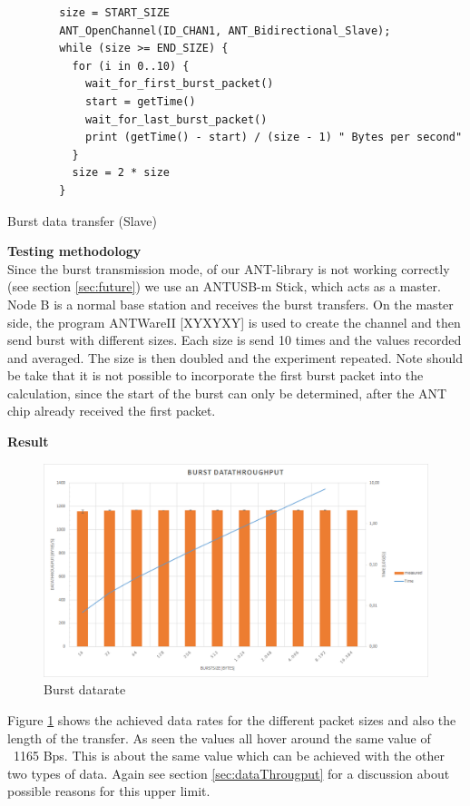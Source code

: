 \begin{description}
	\begin{code}[H]
		\begin{verbatim}
		size = START_SIZE
		ANT_OpenChannel(ID_CHAN1, ANT_Bidirectional_Slave);		
		while (size >= END_SIZE) {
		  for (i in 0..10) {
		    wait_for_first_burst_packet()
		    start = getTime()
		    wait_for_last_burst_packet()
		    print (getTime() - start) / (size - 1) " Bytes per second"
		  }
		  size = 2 * size
		}
		\end{verbatim}
		\caption{Burst data transfer (Slave)}\label{lst:sExp5}
	\end{code}
	\item{\textbf{Testing methodology}} \hfill \\ Since the burst transmission mode, of our ANT-library is not working correctly (see section \ref{sec:future}) we use an ANTUSB-m Stick, which acts as a master. Node B is a normal base station and receives the burst transfers. On the master side, the program ANTWareII [XYXYXY] is used to create the channel and then send burst with different sizes. Each size is send 10 times and the values recorded and averaged. The size is then doubled and the experiment repeated. Note should be take that it is not possible to incorporate the first burst packet into the calculation, since the start of the burst can only be determined, after the ANT chip already received the first packet.
	\item{\textbf{Result}} \hfill \\ 
		\begin{figure}[H]
			\centering
			\includegraphics[scale=0.5]{./pics/exp5.png}
			\caption{Burst datarate}\label{fig:exp5}
		\end{figure}
	 Figure \ref{fig:exp5} shows the achieved data rates for the different packet sizes and also the length of the transfer. As seen the values all hover around the same value of ~1165 Bps. This is about the same value which can be achieved with the other two types of data.
	 Again see section \ref{sec:dataThrougput} for a discussion about possible reasons for this upper limit. 
\end{description}
\newpage

